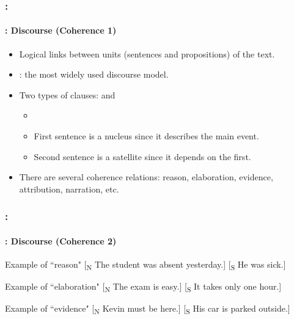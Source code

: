 \documentclass[xcolor=table]{beamer}
\begin{document}
\begin{frame}
	\frametitle{\insertshortsubtitle: \insertsection}
	\framesubtitle{\insertsubsection: Discourse (Coherence 1)}

	\begin{itemize}
		\item Logical links between units (sentences and propositions) of the text.
		\item {}: the most widely used discourse model.
		\item Two types of clauses:  and 
		\begin{itemize}
			\item {}
			\item First sentence is a nucleus since it describes the main event.
			\item Second sentence is a satellite since it depends on the first.
		\end{itemize}
		\item There are several coherence relations: reason, elaboration, evidence, attribution, narration, etc.
	\end{itemize}

\end{frame}

\begin{frame}
	\frametitle{\insertshortsubtitle: \insertsection}
	\framesubtitle{\insertsubsection: Discourse (Coherence 2)}

	\begin{exampleblock}{Example of ``reason"}
		[\textsubscript{N} The student was absent yesterday.] [\textsubscript{S} He was sick.]
	\end{exampleblock}

	\vfill
	
	\begin{exampleblock}{Example of ``elaboration"}
		[\textsubscript{N} The exam is easy.] [\textsubscript{S} It takes only one hour.]
	\end{exampleblock}

	\vfill
	
	\begin{exampleblock}{Example of ``evidence"}
		[\textsubscript{N} Kevin must be here.] [\textsubscript{S} His car is parked outside.]
	\end{exampleblock}

\end{frame}
\end{document}
